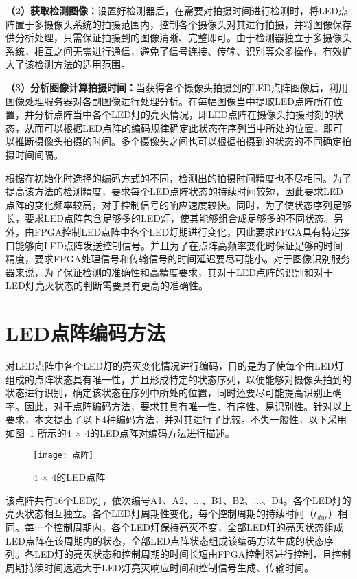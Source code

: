\textbf{（2）获取检测图像：}设置好检测器后，在需要对拍摄时间进行检测时，将LED点阵置于多摄像头系统的拍摄范围内，控制各个摄像头对其进行拍摄，并将图像保存供分析处理，只需保证拍摄到的图像清晰、完整即可。由于检测器独立于多摄像头系统，相互之间无需进行通信，避免了信号连接、传输、识别等众多操作，有效扩大了该检测方法的适用范围。

\textbf{（3）分析图像计算拍摄时间：}当获得各个摄像头拍摄到的LED点阵图像后，利用图像处理服务器对各副图像进行处理分析。在每幅图像当中提取LED点阵所在位置，并分析点阵当中各个LED灯的亮灭情况，即LED点阵在摄像头拍摄时刻的状态，从而可以根据LED点阵的编码规律确定此状态在序列当中所处的位置，即可以推断摄像头拍摄的时间。多个摄像头之间也可以根据拍摄到的状态的不同确定拍摄时间间隔。

根据在初始化时选择的编码方式的不同，检测出的拍摄时间精度也不尽相同。为了提高该方法的检测精度，要求每个LED点阵状态的持续时间较短，因此要求LED点阵的变化频率较高，对于控制信号的响应速度较快。同时，为了使状态序列足够长，要求LED点阵包含足够多的LED灯，使其能够组合成足够多的不同状态。另外，由FPGA控制LED点阵中各个LED灯期进行变化，因此要求FPGA具有特定接口能够向LED点阵发送控制信号。并且为了在点阵高频率变化时保证足够的时间精度，要求FPGA处理信号和传输信号的时间延迟要尽可能小。对于图像识别服务器来说，为了保证检测的准确性和高精度要求，其对于LED点阵的识别和对于LED灯亮灭状态的判断需要具有更高的准确性。

\section{LED点阵编码方法}
\label{codeMe}

对LED点阵中各个LED灯的亮灭变化情况进行编码，目的是为了使每个由LED灯组成的点阵状态具有唯一性，并且形成特定的状态序列，以便能够对摄像头拍到的状态进行识别，确定该状态在序列中所处的位置，同时还要尽可能提高识别正确率。因此，对于点阵编码方法，要求其具有唯一性、有序性、易识别性。针对以上要求，本文提出了以下4种编码方法，并对其进行了比较。不失一般性，以下采用如图~\ref{mat} 所示的4 × 4的LED点阵对编码方法进行描述。

\begin{figure}[h] 
  \centering
  \texttt{[image: 点阵]}
  \caption{4 × 4的LED点阵}
  \label{mat}
\end{figure}

该点阵共有16个LED灯，依次编号A1、A2、...、B1、B2、...、D4。各个LED灯的亮灭状态相互独立。各个LED灯周期性变化，每个控制周期的持续时间（$t_{dur}$）相同。每一个控制周期内，各个LED灯保持亮灭不变，全部LED灯的亮灭状态组成LED点阵在该周期内的状态，全部LED点阵状态组成该编码方法生成的状态序列。各LED灯的亮灭状态和控制周期的时间长短由FPGA控制器进行控制，且控制周期持续时间远远大于LED灯亮灭响应时间和控制信号生成、传输时间。

